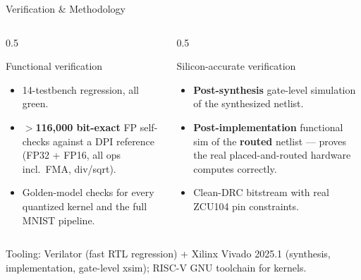 \documentclass[aspectratio=169,11pt]{beamer}
\newcommand{\hl}[1]{{\color{simtixaccent}\textbf{#1}}}
\newcommand{\navy}[1]{{\color{simtixblue}\textbf{#1}}}
\begin{document}
\begin{frame}{Verification \& Methodology}
  \begin{columns}[T]
    \begin{column}{0.5\textwidth}
      \begin{block}{Functional verification}
        \small
        \begin{itemize}
          \item 14-testbench regression, all green.
          \item \hl{$>$116{,}000 bit-exact} FP self-checks against a DPI reference (FP32 + FP16,
            all ops incl.\ FMA, div/sqrt).
          \item Golden-model checks for every quantized kernel and the full MNIST pipeline.
        \end{itemize}
      \end{block}
    \end{column}
    \begin{column}{0.5\textwidth}
      \begin{block}{Silicon-accurate verification}
        \small
        \begin{itemize}
          \item \navy{Post-synthesis} gate-level simulation of the synthesized netlist.
          \item \navy{Post-implementation} functional sim of the \hl{routed} netlist --- proves
            the real placed-and-routed hardware computes correctly.
          \item Clean-DRC bitstream with real ZCU104 pin constraints.
        \end{itemize}
      \end{block}
    \end{column}
  \end{columns}
  \vspace{0.3em}
  {\footnotesize Tooling: Verilator (fast RTL regression) + Xilinx Vivado 2025.1 (synthesis,
  implementation, gate-level xsim); RISC-V GNU toolchain for kernels.}
\end{frame}
\end{document}
